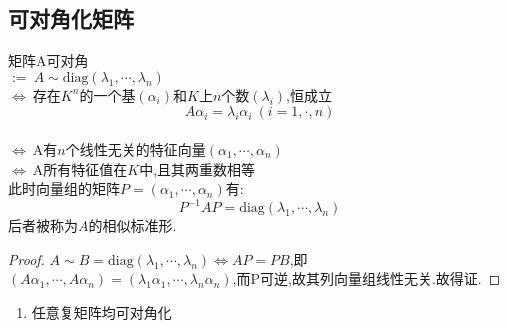 \documentclass[UTF8,a4paper,notitlepage]{book}
\begin{document}
        \subsection{可对角化矩阵}
        \begin{theorem}[可对角化的充要条件]\mbox{}
            矩阵A可对角\\
            $:=~A\sim \mathrm{diag}(\lambda_1,\cdots,\lambda_n)$\\ 
            $\Leftrightarrow~$存在$K^n$的一个基$(\alpha_i)$和$K$上$n$个数$(\lambda_i)$,恒成立$$A\alpha_i=\lambda_i\alpha_i~(i=1,\cdot,n)$$\\ 
            $\Leftrightarrow~$A有$n$个线性无关的特征向量$(\alpha_1,\cdots,\alpha_n)$\\
            $\Leftrightarrow~$A所有特征值在$K$中,且其两重数相等\\
            此时向量组的矩阵$P=(\alpha_1,\cdots,\alpha_n)$有:$$P^{-1}AP=\mathrm{diag}(\lambda_1,\cdots,\lambda_n)$$
            后者被称为$A$的相似标准形.
        \end{theorem}
        \begin{proof} 
            $A\sim B=\mathrm{diag}(\lambda_1,\cdots,\lambda_n)\Leftrightarrow AP=PB$,即\\ 
            $(A\alpha_1,\cdots,A\alpha_n)=(\lambda_1\alpha_1,\cdots,\lambda_n\alpha_n)$,而P可逆,故其列向量组线性无关.故得证.
        \end{proof}
        \begin{corollary}[矩阵的可对角性]\begin{enumerate}\mbox{}%
                \item 任意复矩阵均可对角化
        \end{enumerate}\end{corollary}
\end{document}
